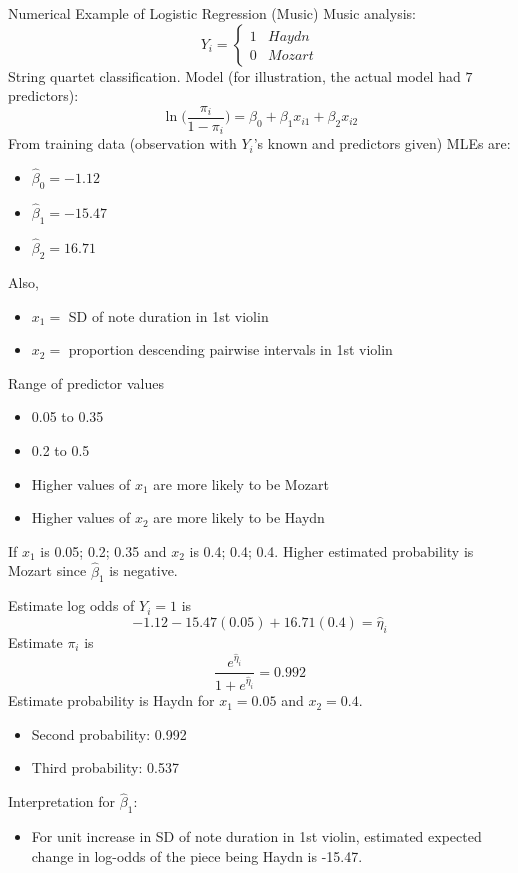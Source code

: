 \begin{Example}{Numerical Example of Logistic Regression (Music)}{}
    Music analysis:
    \[ Y_i=\begin{cases*}
            1 & Haydn\\
            0 & Mozart
        \end{cases*} \]
    String quartet classification. Model (for illustration, the actual model
    had $ 7 $ predictors):
    \[ \ln\biggl(\frac{\pi_i}{1-\pi_i}\biggr)=\beta_0+\beta_1x_{i1}+\beta_2x_{i2} \]
    From training data (observation with $ Y_i $'s known and predictors given)
    MLEs are:
    \begin{itemize}
        \item $ \hat{\beta}_0=-1.12 $
        \item $ \hat{\beta}_1=-15.47 $
        \item $ \hat{\beta}_2=16.71 $
    \end{itemize}
    Also,
    \begin{itemize}
        \item $ x_1= $ SD of note duration in 1st violin
        \item $ x_2= $ proportion descending pairwise intervals
              in 1st violin
    \end{itemize}
    Range of predictor values
    \begin{itemize}
        \item 0.05 to 0.35
        \item 0.2 to 0.5
    \end{itemize}
    \begin{itemize}
        \item Higher values of $ x_1 $ are more likely to be Mozart
        \item Higher values of $ x_2 $ are more likely to be Haydn
    \end{itemize}
    If $ x_1 $ is 0.05; 0.2; 0.35 and $ x_2 $ is 0.4; 0.4; 0.4.
    Higher estimated probability is Mozart since $ \hat{\beta}_1 $
    is negative.

    Estimate log odds of $ Y_i=1 $ is
    \[ -1.12-15.47(0.05)+16.71(0.4)=\hat{\eta}_i \]
    Estimate $ \pi_i $ is
    \[ \frac{e^{\hat{\eta}_i}}{1+e^{\hat{\eta}_i}}=0.992  \]
    Estimate probability is Haydn for $ x_1=0.05 $ and $ x_2=0.4 $.
    \begin{itemize}
        \item Second probability: 0.992
        \item Third probability: 0.537
    \end{itemize}
    Interpretation for $ \hat{\beta}_1 $:
    \begin{itemize}
        \item For unit increase in SD of note duration in 1st violin,
              estimated expected change in log-odds of the piece being Haydn
              is -15.47.
    \end{itemize}
\end{Example}
